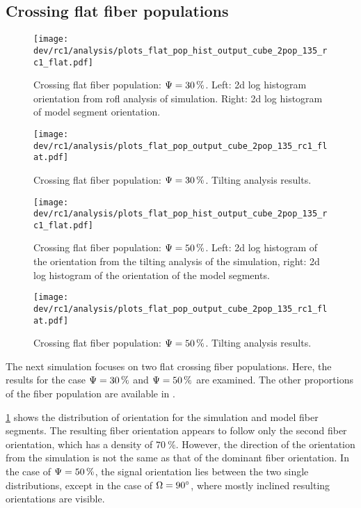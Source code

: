 \subsection{Crossing flat fiber populations}
\label{sec:resCrossFlat}
%
\begin{figure}[!t]
\centering
\texttt{[image: dev/rc1/analysis/plots\_flat\_pop\_hist\_output\_cube\_2pop\_135\_rc1\_flat.pdf]}
\caption{Crossing flat fiber population: $\textnormal{$\Psi$}=\SI{30}{\percent}$. Left: 2d log histogram orientation from rofl analysis of simulation. Right: 2d log histogram of model segment orientation.}
\label{fig:flat_03_fiber_pop_hist}
\end{figure}
%
\begin{figure}[!p]
\centering
\texttt{[image: dev/rc1/analysis/plots\_flat\_pop\_output\_cube\_2pop\_135\_rc1\_flat.pdf]}
\caption{Crossing flat fiber population: $\textnormal{$\Psi$}=\SI{30}{\percent}$. Tilting analysis results. }
\label{fig:flat_03_fiber_pop_rofl}
\end{figure}
%
\begin{figure}[!t]
\centering
\texttt{[image: dev/rc1/analysis/plots\_flat\_pop\_hist\_output\_cube\_2pop\_135\_rc1\_flat.pdf]}
\caption{Crossing flat fiber population: $\textnormal{$\Psi$}=\SI{50}{\percent}$. Left: 2d log histogram of the orientation from the tilting analysis of the simulation, right: 2d log histogram of the orientation of the model segments.}
\label{fig:flat_05_fiber_pop_hist}
\end{figure}
%
\begin{figure}[!p]
\centering
\texttt{[image: dev/rc1/analysis/plots\_flat\_pop\_output\_cube\_2pop\_135\_rc1\_flat.pdf]}
\caption{Crossing flat fiber population: $\textnormal{$\Psi$}=\SI{50}{\percent}$. Tilting analysis results.}
\label{fig:flat_05_fiber_pop_rofl}
\end{figure}
%
The next simulation focuses on two flat crossing fiber populations.
Here, the results for the case $\textnormal{$\Psi$} = \SI{30}{\percent}$ and $\textnormal{$\Psi$} = \SI{50}{\percent}$ are examined.
The other proportions of the fiber population are available in .
\par
%
\ref{fig:flat_03_fiber_pop_hist} shows the distribution of orientation for the simulation and model fiber segments.
The resulting fiber orientation appears to follow only the second fiber orientation, which has a density of $\SI{70}{\percent}$.
However, the direction of the orientation from the simulation is not the same as that of the dominant fiber orientation.
In the case of $\textnormal{$\Psi$} = \SI{50}{\percent}$, the signal orientation lies between the two single distributions, except in the case of $\textnormal{$\Omega$} = \SI{90}{\degree}$, where mostly inclined resulting orientations are visible.
